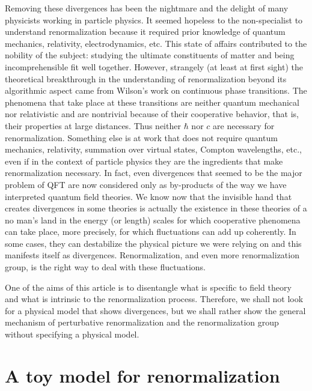 \documentclass[floatfix,preprintnumbers,amsmath,amssymb,prb,12pt]{revtex4-1}
\begin{document}
Removing these divergences has been the nightmare and the delight
of many physicists working in particle physics. It seemed hopeless
to the non-specialist to understand renormalization because it
required prior knowledge of quantum mechanics, relativity,
electrodynamics, etc. This state of affairs contributed to the
nobility of the subject: studying the ultimate constituents
of matter and being incomprehensible fit well together. However,
strangely (at least at first sight) the theoretical breakthrough
in the understanding of renormalization beyond its algorithmic
aspect came from Wilson's work on continuous phase
transitions.\cite{wilson74} The phenomena that take
place at these transitions are neither quantum
mechanical\cite{foot1} nor relativistic and are nontrivial because
of their cooperative behavior, that is, their properties at large
distances.\cite{foot2} Thus neither
$\hbar$ nor $c$ are necessary for renormalization. Something
else is at work that does not require quantum mechanics,
relativity, summation over virtual states, Compton wavelengths,
etc., even if in the context of particle physics they are the
ingredients that make renormalization necessary. In fact, even
divergences that seemed to be the major problem of QFT are now
considered only as by-products of the way we have interpreted
quantum field theories. We know now that the invisible hand that
creates divergences in some theories is actually the existence in
these theories of a no man's land in the energy (or length) scales
for which cooperative phenomena can take place, more precisely,
for which fluctuations can add
up coherently.\cite{lepage89} In some cases,
they can destabilize the physical picture we were relying on and
this manifests itself as divergences. Renormalization, and even
more renormalization group, is the right way to deal with these
fluctuations.

One of the aims of this article is to disentangle what is specific
to field theory and what is intrinsic to the renormalization
process. Therefore, we shall not look for a physical model that 
shows
divergences,\cite{kraus92,mitra98,gosdzinsky91,mead91,adhikari97}
but we shall rather show the general mechanism of perturbative
renormalization and the renormalization group without specifying
a physical model.

\section{A toy model for renormalization}
\end{document}
